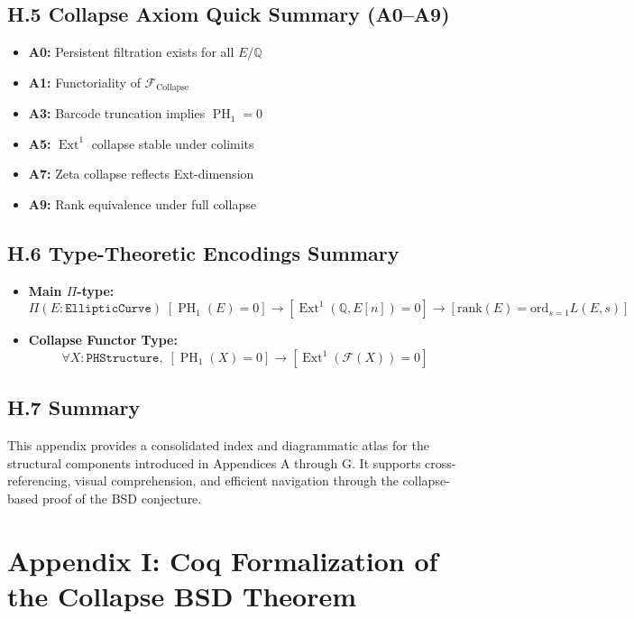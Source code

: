 \documentclass[11pt]{article}
\DeclareMathOperator{\Ext}{Ext}
\DeclareMathOperator{\PH}{PH}
\newcommand{\QQ}{\mathbb{Q}}
\begin{document}
\subsection*{H.5 Collapse Axiom Quick Summary (A0–A9)}

\begin{itemize}
  \item \textbf{A0:} Persistent filtration exists for all $E/\QQ$
  \item \textbf{A1:} Functoriality of $\mathcal{F}_{\mathrm{Collapse}}$
  \item \textbf{A3:} Barcode truncation implies $\PH_1 = 0$
  \item \textbf{A5:} $\Ext^1$ collapse stable under colimits
  \item \textbf{A7:} Zeta collapse reflects Ext-dimension
  \item \textbf{A9:} Rank equivalence under full collapse
\end{itemize}

\subsection*{H.6 Type-Theoretic Encodings Summary}

\begin{itemize}
  \item \textbf{Main $\Pi$-type:}
  \[
  \Pi (E : \texttt{EllipticCurve})\; 
  [\PH_1(E) = 0] \to [\Ext^1(\QQ,E[n]) = 0] \to [\mathrm{rank}(E) = \mathrm{ord}_{s=1} L(E,s)]
  \]
  \item \textbf{Collapse Functor Type:}
  \[
  \forall X : \texttt{PHStructure},\; [\PH_1(X) = 0] \to [\Ext^1(\mathcal{F}(X)) = 0]
  \]
\end{itemize}

\subsection*{H.7 Summary}

This appendix provides a consolidated index and diagrammatic atlas for the structural components introduced in Appendices A through G.  
It supports cross-referencing, visual comprehension, and efficient navigation through the collapse-based proof of the BSD conjecture.




\section*{Appendix I: Coq Formalization of the Collapse BSD Theorem}
\end{document}
